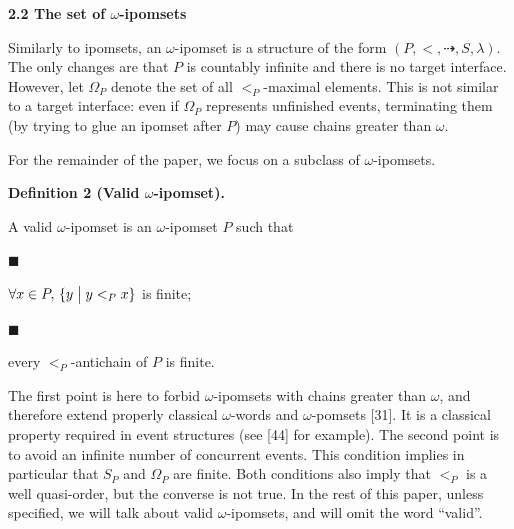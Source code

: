 \documentclass[10pt,a4paper]{article}
\begin{document}
 
\par\medskip\noindent\textbf{2.2 The set of $\omega$-ipomsets}\par
 
 
Similarly to ipomsets, an $\omega$-ipomset is a structure of the form $(P,{<},{\dashrightarrow},S,\lambda)$. The only changes are that $P$ is countably infinite and there is no target interface. However, let $\Omega_{P}$ denote the set of all $<_{P}$-maximal elements. This is not similar to a target interface: even if $\Omega_{P}$ represents unfinished events, terminating them (by trying to glue an ipomset after $P$) may cause chains greater than $\omega$.\par
 
 
 
For the remainder of the paper, we focus on a subclass of $\omega$-ipomsets.\par
 
 
 
\par\medskip\noindent\textbf{Definition 2 (Valid $\omega$-ipomset).}\par
 
 
A valid $\omega$-ipomset is an $\omega$-ipomset $P$ such that\par
  
\par\noindent  $\blacksquare$ 
 
$\forall x\in P,\,{\{y\mathrel{\big{|}}y<_{P}x\}}$ is finite;\par
 
 
 
\par\noindent  $\blacksquare$ 
 
every $<_{P}$-antichain of $P$ is finite.\par
 
 
  
 
 
 
The first point is here to forbid $\omega$-ipomsets with chains greater than $\omega$, and therefore extend properly classical $\omega$-words and $\omega$-pomsets [31]. It is a classical property required in event structures (see [44] for example). The second point is to avoid an infinite number of concurrent events. This condition implies in particular that $S_{P}$ and $\Omega_{P}$ are finite. Both conditions also imply that $<_{P}$ is a well quasi-order, but the converse is not true. In the rest of this paper, unless specified, we will talk about valid $\omega$-ipomsets, and will omit the word “valid”.\par
 
\end{document}
